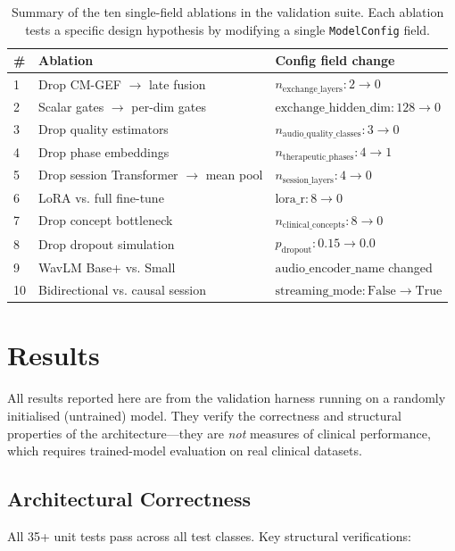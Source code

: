 \documentclass{article}
\begin{document}
\begin{table}[h]
\caption{Summary of the ten single-field ablations in the validation suite. Each
ablation tests a specific design hypothesis by modifying a single
\texttt{ModelConfig} field.}
\label{tab:ablations}
\centering
\begin{tabular}{lll}
\toprule
\# & Ablation & Config field change \\
\midrule
1 & Drop CM-GEF $\to$ late fusion & $n_{\text{exchange\_layers}}: 2 \to 0$ \\
2 & Scalar gates $\to$ per-dim gates & $\text{exchange\_hidden\_dim}: 128 \to 0$ \\
3 & Drop quality estimators & $n_{\text{audio\_quality\_classes}}: 3 \to 0$ \\
4 & Drop phase embeddings & $n_{\text{therapeutic\_phases}}: 4 \to 1$ \\
5 & Drop session Transformer $\to$ mean pool & $n_{\text{session\_layers}}: 4 \to 0$ \\
6 & LoRA vs. full fine-tune & $\text{lora\_r}: 8 \to 0$ \\
7 & Drop concept bottleneck & $n_{\text{clinical\_concepts}}: 8 \to 0$ \\
8 & Drop dropout simulation & $p_{\text{dropout}}: 0.15 \to 0.0$ \\
9 & WavLM Base+ vs. Small & $\text{audio\_encoder\_name}$ changed \\
10 & Bidirectional vs. causal session & $\text{streaming\_mode}: \text{False} \to \text{True}$ \\
\bottomrule
\end{tabular}
\end{table}


\section{Results}
\label{sec:results}

All results reported here are from the validation harness running on a randomly
initialised (untrained) model. They verify the correctness and structural properties of
the architecture---they are \emph{not} measures of clinical performance, which requires
trained-model evaluation on real clinical datasets.

\subsection{Architectural Correctness}

All 35+ unit tests pass across all test classes. Key structural verifications:
\end{document}
